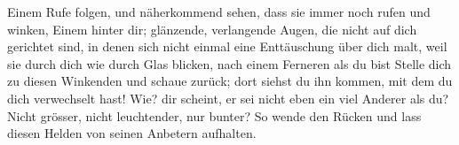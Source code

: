 Einem Rufe folgen, und näherkommend sehen, dass sie immer noch rufen und winken, Einem hinter dir; glänzende, verlangende Augen, die nicht auf dich gerichtet sind, in denen sich nicht einmal eine Enttäuschung über dich malt, weil sie durch dich wie durch Glas blicken, nach einem Ferneren als du bist Stelle dich zu diesen Winkenden und schaue zurück; dort siehst du ihn kommen, mit dem du dich verwechselt hast! Wie? dir scheint, er sei nicht eben ein viel Anderer als du? Nicht grösser, nicht leuchtender, nur bunter? So wende den Rücken und lass diesen Helden von seinen Anbetern aufhalten.
\par

